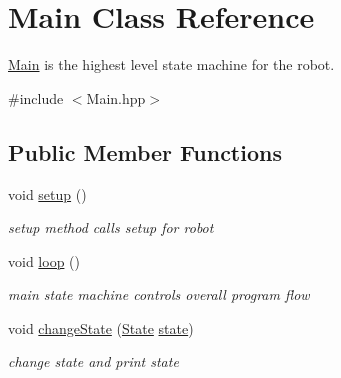 \hypertarget{classMain}{\section{Main Class Reference}
\label{classMain}
}


\hyperlink{classMain}{Main} is the highest level state machine for the robot.  




{\ttfamily \#include $<$Main.\-hpp$>$}

\subsection*{Public Member Functions}
\begin{DoxyCompactItemize}
\item 
void \hyperlink{classMain_ab93af44e220d33016f01ed1b70612899}{setup} ()
\begin{DoxyCompactList}\small\item\em setup method calls setup for robot \end{DoxyCompactList}\item 
void \hyperlink{classMain_ac061692135a219ec5b7a8211c4e26ed6}{loop} ()
\begin{DoxyCompactList}\small\item\em main state machine controls overall program flow \end{DoxyCompactList}\item 
void \hyperlink{classMain_a2c24ed69c03010e24c109b7b4d59eca1}{change\-State} (\hyperlink{classMain_a551231243a758b95cf29d8ed2b7508da}{State} \hyperlink{classMain_a8b4ada43c3c3720b177018191ac6ee90}{state})
\begin{DoxyCompactList}\small\item\em change state and print state \end{DoxyCompactList}\end{DoxyCompactItemize}
